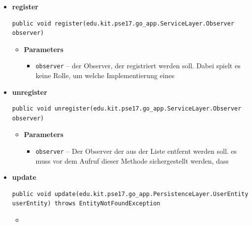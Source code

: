\documentclass[11pt,a4paper]{article}
\begin{document}
{{{{{{{{{{{{{{{\begin{itemize}
{\begin{itemize}
\end{itemize}
}%
\item{ 
\hypertarget{edu.kit.pse17.go_app.PersistenceLayer.daos.UserDaoImp.register(edu.kit.pse17.go_app.ServiceLayer.Observer)}{{\bf  register}\\}
\begin{lstlisting}[frame=none]
public void register(edu.kit.pse17.go_app.ServiceLayer.Observer observer)\end{lstlisting} %
\begin{itemize}
\item{
{\bf  Parameters}
  \begin{itemize}
   \item{
\texttt{observer} -- der Observer, der registriert werden soll. Dabei spielt es keine Rolle, um welche Implementierung eines}
  \end{itemize}
}%
\end{itemize}
}%
\item{ 
\hypertarget{edu.kit.pse17.go_app.PersistenceLayer.daos.UserDaoImp.unregister(edu.kit.pse17.go_app.ServiceLayer.Observer)}{{\bf  unregister}\\}
\begin{lstlisting}[frame=none]
public void unregister(edu.kit.pse17.go_app.ServiceLayer.Observer observer)\end{lstlisting} %
\begin{itemize}
\item{
{\bf  Parameters}
  \begin{itemize}
   \item{
\texttt{observer} -- Der Observer der aus der Liste entfernt werden soll. es muss vor dem Aufruf dieser Methode sichergestellt werden, dass}
  \end{itemize}
}%
\end{itemize}
}%
\item{ 
\hypertarget{edu.kit.pse17.go_app.PersistenceLayer.daos.UserDaoImp.update(edu.kit.pse17.go_app.PersistenceLayer.UserEntity)}{{\bf  update}\\}
\begin{lstlisting}[frame=none]
public void update(edu.kit.pse17.go_app.PersistenceLayer.UserEntity userEntity) throws EntityNotFoundException\end{lstlisting} %
\begin{itemize}
\item{
}
\end{itemize}}
\end{itemize}}}}}}}}}}}}}}}}
\end{document}
